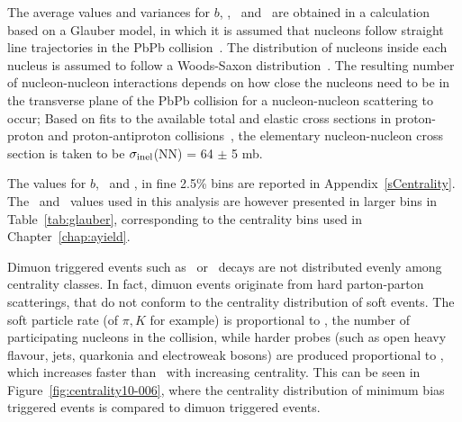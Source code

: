 The average values and variances for $b$, \Npart, \Ncoll\ and \TAA\ are
obtained in a calculation based on a Glauber model, in which it is
assumed that nucleons follow straight line trajectories in the PbPb
collision~\cite{Miller:2007ri}. The distribution of nucleons inside
each nucleus is assumed to follow a Woods-Saxon
distribution~\cite{de1974nuclear}. The resulting number of
nucleon-nucleon interactions depends on how close the nucleons need to
be in the transverse plane of the PbPb collision for a nucleon-nucleon
scattering to occur; Based on fits to the available total and elastic
cross sections in proton-proton and proton-antiproton
collisions~\cite{Agashe:2014kda}, the elementary nucleon-nucleon cross section
is taken to be $\sigma_{\rm inel}$(NN) = 64 $\pm$ 5 mb. 


The values for $b$, \Npart\ and \Ncoll, in fine 2.5\% bins are
reported in Appendix~\ref{sCentrality}. The \Npart\ and \TAA\ values used in this
analysis are however presented in larger bins in Table~\ref{tab:glauber},
corresponding to the centrality bins used in Chapter~\ref{chap:ayield}.

Dimuon triggered
events such as \Jpsi\ or \PgU\ decays are not distributed evenly among centrality classes. In fact,
dimuon events originate from hard parton-parton scatterings, that do
not conform to the centrality distribution of soft events. The soft
particle rate (of $\pi, K$ for example) is proportional to \Npart, the
number of participating nucleons in the collision, while harder probes
(such as open heavy flavour, jets, quarkonia and electroweak bosons)
are produced proportional to \Ncoll, which increases faster than
\Npart\ with increasing centrality. This can be seen in
Figure~\ref{fig:centrality10-006}, where the centrality distribution
of minimum bias triggered events is compared to dimuon triggered
events.

